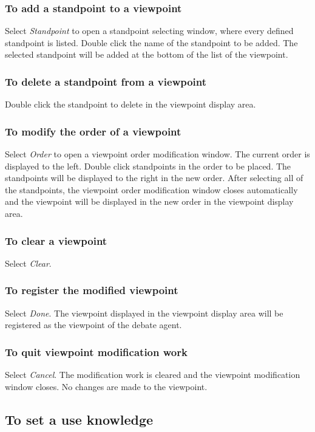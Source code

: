 \subsubsection{To add a standpoint to a viewpoint}
Select {\sl Standpoint} to open a standpoint selecting window, where every defined standpoint is listed.
Double click the name of the standpoint to be added.
The selected standpoint will be added at the bottom of the list of the viewpoint.

\subsubsection{To delete a standpoint from a viewpoint}
Double click the standpoint to delete in the viewpoint display area.

\subsubsection{To modify the order of a viewpoint}
Select {\sl Order} to open a viewpoint order modification window.
The current order is displayed to the left.
Double click standpoints in the order to be placed.
The standpoints will be displayed to the right in the new order.
After selecting all of the standpoints, the viewpoint order modification window closes automatically and the viewpoint will be displayed in the new order in the viewpoint display area.

\subsubsection{To clear a viewpoint}
Select {\sl Clear}.

\subsubsection{To register the modified viewpoint}
Select {\sl Done}.  The viewpoint displayed in the viewpoint display
area will be registered as the viewpoint of the debate agent.


\subsubsection{To quit viewpoint modification work}
Select {\sl Cancel}.
The modification work is cleared and the viewpoint modification window closes. 
No changes are made to the viewpoint.

\subsection{To set a use knowledge}\label{To set a use knowledge}

